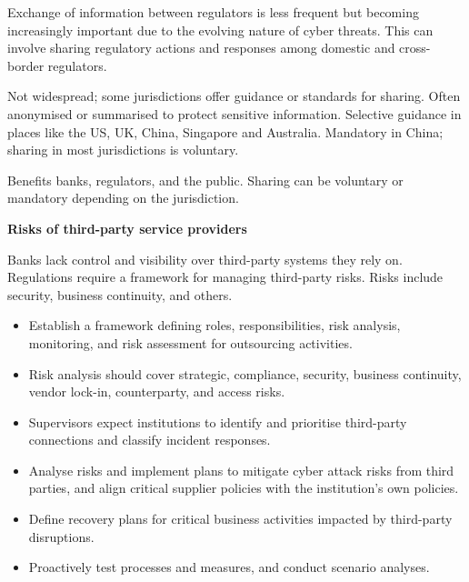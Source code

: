 
Exchange of information between regulators is less frequent but becoming
increasingly important due to the evolving nature of cyber threats. This can
involve sharing regulatory actions and responses among domestic and cross-border
regulators.


Not widespread; some jurisdictions offer guidance or standards for sharing. Often
anonymised or summarised to protect sensitive information. Selective guidance in
places like the US, UK, China, Singapore and Australia. Mandatory in China;
sharing in most jurisdictions is voluntary.


Benefits banks, regulators, and the public. Sharing can be voluntary or mandatory
depending on the jurisdiction.


\begin{orkeybox}
{\sffamily\bfseries\fontsize{8.6}{10}\selectfont\color{navy}Risks of third-party
service providers}\par
\vspace{4pt}
Banks lack control and visibility over third-party systems they rely on.
Regulations require a framework for managing third-party risks. Risks include
security, business continuity, and others.
\end{orkeybox}

\begin{itemize}
\item Establish a framework defining roles, responsibilities, risk analysis,
monitoring, and risk assessment for outsourcing activities.
\item Risk analysis should cover strategic, compliance, security, business
continuity, vendor lock-in, counterparty, and access risks.
\item Supervisors expect institutions to identify and prioritise third-party
connections and classify incident responses.
\end{itemize}

\begin{itemize}
\item Analyse risks and implement plans to mitigate cyber attack risks from third
parties, and align critical supplier policies with the institution's own
policies.
\item Define recovery plans for critical business activities impacted by
third-party disruptions.
\item Proactively test processes and measures, and conduct scenario analyses.
\end{itemize}

